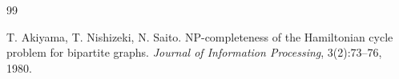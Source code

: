\documentclass[a4paper,11pt,dvipsnames]{elsarticle}
\begin{document}
\begin{thebibliography}{99}



 T. Akiyama, T. Nishizeki, N. Saito. \textsf{NP}-completeness of the Hamiltonian cycle problem for bipartite graphs. \textit{Journal of Information Processing}, 3(2):73--76, 1980.












\end{thebibliography}
\end{document}
